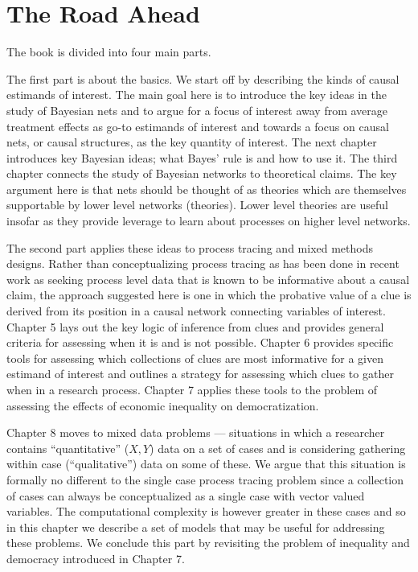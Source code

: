 \documentclass[12pt,]{book}
\begin{document}
\hypertarget{the-road-ahead}{%
\section{The Road Ahead}\label{the-road-ahead}}

The book is divided into four main parts.

The first part is about the basics. We start off by describing the kinds of causal estimands of interest. The main goal here is to introduce the key ideas in the study of Bayesian nets and to argue for a focus of interest away from average treatment effects as go-to estimands of interest and towards a focus on causal nets, or causal structures, as the key quantity of interest. The next chapter introduces key Bayesian ideas; what Bayes' rule is and how to use it. The third chapter connects the study of Bayesian networks to theoretical claims. The key argument here is that nets should be thought of as theories which are themselves supportable by lower level networks (theories). Lower level theories are useful insofar as they provide leverage to learn about processes on higher level networks.

The second part applies these ideas to process tracing and mixed methods designs. Rather than conceptualizing process tracing as has been done in recent work as seeking process level data that is known to be informative about a causal claim, the approach suggested here is one in which the probative value of a clue is derived from its position in a causal network connecting variables of interest. Chapter 5 lays out the key logic of inference from clues and provides general criteria for assessing when it is and is not possible. Chapter 6 provides specific tools for assessing which collections of clues are most informative for a given estimand of interest and outlines a strategy for assessing which clues to gather when in a research process. Chapter 7 applies these tools to the problem of assessing the effects of economic inequality on democratization.

Chapter 8 moves to mixed data problems --- situations in which a researcher contains ``quantitative'' (\(X,Y\)) data on a set of cases and is considering gathering within case (``qualitative'') data on some of these. We argue that this situation is formally no different to the single case process tracing problem since a collection of cases can always be conceptualized as a single case with vector valued variables. The computational complexity is however greater in these cases and so in this chapter we describe a set of models that may be useful for addressing these problems. We conclude this part by revisiting the problem of inequality and democracy introduced in Chapter 7.
\end{document}
